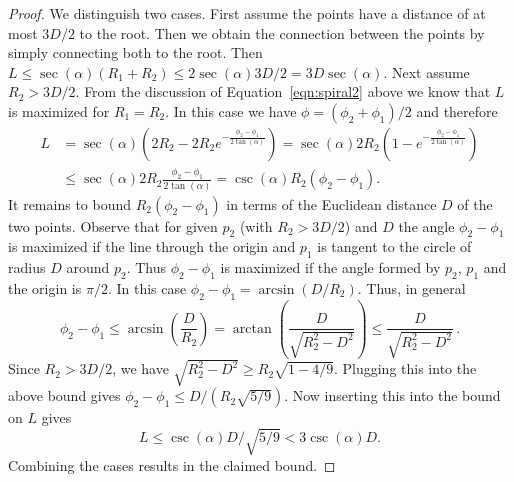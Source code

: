 \documentclass{journalA4}
\begin{document}
\begin{proof}
We distinguish two cases. First assume the points have a distance of at most $3D/2$ to the root. Then we obtain the connection between the points by simply connecting both to the root. Then $L \leq \sec(\alpha) (R_1+R_2) \leq 2 \sec(\alpha) 3D/2 = 3 D \sec(\alpha)$.
Next assume $R_2>3D/2$.
From the discussion of Equation~\ref{eqn:spiral2} above we know that $L$ is maximized for $R_1=R_2$. In this case we have $\phi = (\phi_2+\phi_1)/2$ and therefore
\begin{align*}
L &= \sec (\alpha) (2 R_2 - 2 R_2 e^{- \frac{\phi_2-\phi_1}{2\tan (\alpha)}})  = \sec (\alpha) 2 R_2 (1 - e^{- \frac{\phi_2-\phi_1}{2\tan (\alpha)}})\\
 &\leq \sec (\alpha) 2 R_2 \frac{\phi_2-\phi_1}{2\tan (\alpha)} = \csc (\alpha) R_2 (\phi_2-\phi_1).
\end{align*}
It remains to bound $R_2 (\phi_2-\phi_1)$ in terms of the Euclidean distance $D$ of the two points. Observe that for given $p_2$ (with $R_2>3D/2$) and $D$ the angle $\phi_2-\phi_1$ is maximized if the line through the origin and $p_1$ is tangent to the circle of radius $D$ around $p_2$. Thus $\phi_2-\phi_1$ is maximized if the angle formed by $p_2$, $p_1$ and the origin is $\pi/2$. In this case $\phi_2-\phi_1 = \arcsin(D/R_2)$. Thus, in general
\[
\phi_2-\phi_1 \leq \arcsin \left( \frac{D}{R_2} \right) =  \arctan \left( \frac{D}{\sqrt{R_2^2 - D^2}} \right) \leq \frac{D}{\sqrt{R_2^2 - D^2}} \, .
\]
Since $R_2>3D/2$, we have $\sqrt{R_2^2 - D^2}\geq R_2 \sqrt{1-4/9}$. Plugging this into the above bound gives $\phi_2-\phi_1 \leq D/(R_2\sqrt{5/9})$. Now inserting this into the bound on $L$ gives
\[
L \leq \csc (\alpha) D/\sqrt{5/9} < 3 \csc (\alpha) D.
\]
Combining the cases results in the claimed bound.
\end{proof}
\end{document}
